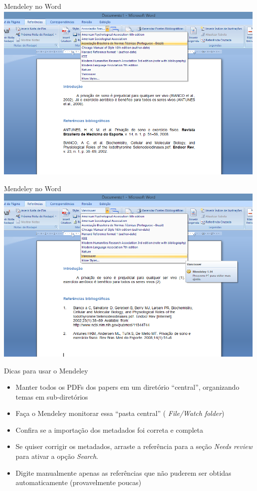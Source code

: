 \documentclass{beamer}
\begin{document}
\begin{frame}{Mendeley no Word}
  \includegraphics[width=1.1\textwidth]{Referencias/mendeley-word-ABNT}
\end{frame}

\begin{frame}{Mendeley no Word}
  \includegraphics[width=1.1\textwidth]{Referencias/mendeley-word-vancouver}
\end{frame}

\begin{frame}{Dicas para usar o Mendeley}
  \begin{itemize}
  \item Manter \alert{todos} os PDFs dos papers em um diretório
    ``central'', organizando temas em sub-diretórios
  \item Faça o Mendeley \alert{monitorar} essa ``pasta central'' ({\em
      File/Watch folder})
  \item Confira se a importação dos metadados foi correta e completa
  \item Se quiser corrigir os metadados, arraste a referência para a
    seção {\em Needs review} para ativar a opção {\em Search}.
  \item Digite manualmente apenas as referências que não puderem ser
    obtidas automaticamente (provavelmente poucas)
  \end{itemize}
\end{frame}
\end{document}
